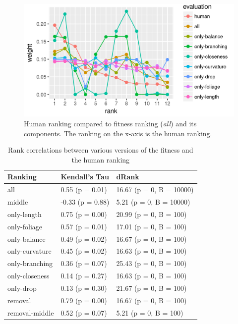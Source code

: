 \begin{figure}
    \centering
    \includegraphics[width=1.0\textwidth]{figures/fitcmp-only}
    \caption[Human ranking compared to fitness ranking and its components]{Human ranking compared to fitness ranking (\textit{all}) and its components. The ranking on the x-axis is the human ranking.}
    \label{fig:fitcmp-only}
\end{figure}

\begin{table}
    \centering
    \begin{tabular}{| l | l | l |}
    \hline
    \textbf{Ranking} & \textbf{Kendall's Tau} & \textbf{dRank} \\
    \hline
                all & 0.55 (p = 0.01)  & 16.67 (p = 0, B = 10000) \\
             middle & -0.33 (p = 0.88) & 5.21 (p = 0, B = 10000) \\
        only-length & 0.75 (p = 0.00)  & 20.99 (p = 0, B = 100) \\
       only-foliage & 0.57 (p = 0.01)  & 17.01 (p = 0, B = 100) \\
       only-balance & 0.49 (p = 0.02)  & 16.67 (p = 0, B = 100) \\
     only-curvature & 0.45 (p = 0.02)  & 16.63 (p = 0, B = 100) \\
     only-branching & 0.36 (p = 0.07)  & 25.43 (p = 0, B = 100) \\
     only-closeness & 0.14 (p = 0.27)  & 16.63 (p = 0, B = 100) \\
          only-drop & 0.13 (p = 0.30)  & 21.67 (p = 0, B = 100) \\
            removal & 0.79 (p = 0.00)  & 16.67 (p = 0, B = 100) \\
     removal-middle & 0.52 (p = 0.07)  & 5.21 (p = 0, B = 100) \\
    \hline
    \end{tabular}
    \caption[Various rank correlations]{Rank correlations between various versions of the fitness and the human ranking}
    \label{tab:rankstats}
\end{table}

